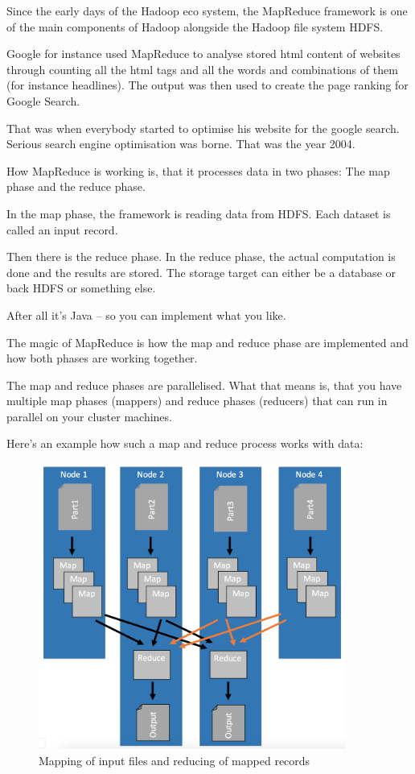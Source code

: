 \documentclass[12pt, numbers=noenddot]{scrreprt} %
\begin{document}
Since the early days of the Hadoop eco system, the MapReduce framework is one of the main components of Hadoop alongside the Hadoop file system HDFS.

Google for instance used MapReduce to analyse stored html content of websites through counting all the html tags and all the words and combinations of them (for instance headlines). The output was then used to create the page ranking for Google Search.

That was when everybody started to optimise his website for the google search. Serious search engine optimisation was borne. That was the year 2004.

How MapReduce is working is, that it processes data in two phases: The map phase and the reduce phase.

In the map phase, the framework is reading data from HDFS. Each dataset is called an input record.

Then there is the reduce phase. In the reduce phase, the actual computation is done and the results are stored. The storage target can either be a database or back HDFS or something else.

After all it’s Java – so you can implement what you like.

The magic of MapReduce is how the map and reduce phase are implemented and how both phases are working together.

The map and reduce phases are parallelised. What that means is, that you have multiple map phases (mappers) and reduce phases (reducers) that can run in parallel on your cluster machines.

Here's an example how such a map and reduce process works with data:

\begin{figure}[htbp]
  \centering
     \includegraphics[width=0.9\textwidth]{images/MapReduce-Process-Detailed}
  \caption{Mapping of input files and reducing of mapped records}
  \label{fig:Bild1}
\end{figure}
\end{document}
